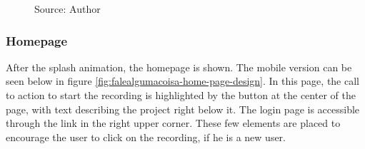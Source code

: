 \begin{figure}[ht]
    \caption*{Source: Author}
    \label{fig:falealgumacoisa-splash-page-design}
\end{figure}

\subsubsection{Homepage}

After the splash animation, the homepage is shown. The mobile version can be seen below in figure \ref{fig:falealgumacoisa-home-page-design}. In this page, the call to action to start the recording is highlighted by the button at the center of the page, with text describing the project right below it. The login page is accessible through the link in the right upper corner. These few elements are placed to encourage the user to click on the recording, if he is a new user.

